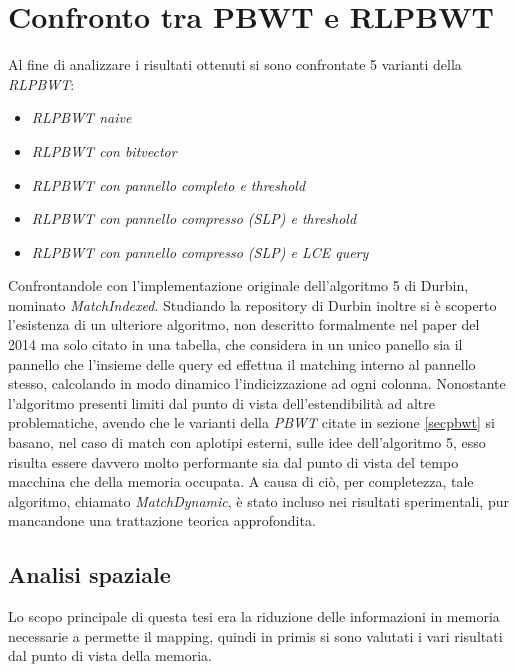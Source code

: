 \section{Confronto tra PBWT e RLPBWT}
Al fine di analizzare i risultati ottenuti si sono confrontate 5 varianti della
\textit{RLPBWT}:
\begin{itemize}
  \item \textit{RLPBWT naive}
  \item \textit{RLPBWT con bitvector}
  \item \textit{RLPBWT con pannello completo e threshold}
  \item \textit{RLPBWT con pannello compresso (SLP) e threshold}
  \item \textit{RLPBWT con pannello compresso (SLP) e LCE query}  
\end{itemize}
Confrontandole con l'implementazione originale dell'algoritmo 5 di Durbin,
nominato \textit{MatchIndexed}. Studiando la repository di Durbin inoltre si è
scoperto l'esistenza di un ulteriore algoritmo, non descritto
formalmente nel paper del 2014 \cite{pbwt} ma solo citato in una tabella, che
considera in un unico panello sia il pannello che l'insieme delle query ed
effettua il matching interno al pannello stesso, calcolando in modo dinamico
l'indicizzazione ad ogni colonna. Nonostante l'algoritmo presenti limiti dal
punto di vista dell'estendibilità ad altre problematiche, avendo che le varianti
della \textit{PBWT} citate in sezione \ref{secpbwt} si basano, nel caso di match
con aplotipi esterni, sulle idee dell'algoritmo 5, esso risulta essere davvero
molto performante sia dal punto di vista del tempo macchina che della memoria
occupata. A causa di ciò, per completezza, tale algoritmo, chiamato
\textit{MatchDynamic}, è stato incluso nei risultati sperimentali, pur
mancandone una trattazione teorica approfondita.
\subsection{Analisi spaziale}
Lo scopo principale di questa tesi era la riduzione delle informazioni in
memoria necessarie a permette il mapping, quindi in primis si sono valutati i
vari risultati dal punto di vista della memoria.
